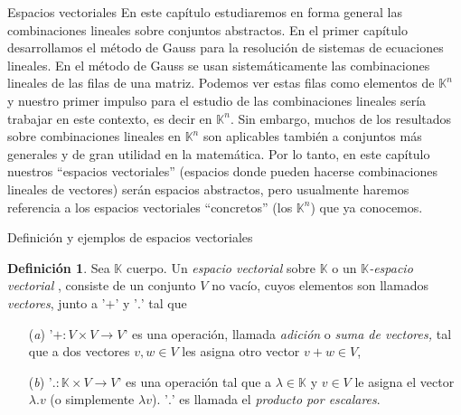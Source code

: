 \documentclass[a4paper,12pt,twoside,spanish,reqno]{amsbook}
\numberwithin{equation}{section}
\theoremstyle{definition}
\newtheorem{definicion}[teorema]{Definici\'on}
\theoremstyle{remark}
\newcommand{\K}{\mathbb K}
\begin{document}
    \begin{chapter}{Espacios vectoriales}\label{chap-esp-vect} En este capítulo estudiaremos en forma general las combinaciones lineales sobre conjuntos abstractos.
        En el primer capítulo desarrollamos el método de Gauss para la resolución de sistemas de ecuaciones lineales. En el método de Gauss se usan sistemáticamente las combinaciones lineales de las filas de una matriz. Podemos ver estas filas como elementos de $\K^n$  y nuestro primer impulso para el estudio de las combinaciones lineales sería trabajar en este contexto, es decir  en $\K^n$.  Sin embargo, muchos de los resultados sobre combinaciones lineales en $\K^n$ son aplicables también a conjuntos más generales y de gran utilidad en la matemática. Por lo tanto, en este capítulo nuestros ``espacios vectoriales'' (espacios donde pueden hacerse combinaciones lineales de vectores) serán espacios abstractos, pero usualmente haremos referencia a los espacios vectoriales ``concretos'' (los $\K^n$) que ya conocemos. 
        

        

        
        \begin{section}{Definición y ejemplos de espacios vectoriales}\label{seccion-definicion-de-espacios-vectoriales}
            
            \begin{definicion}\label{def-esp-vect} Sea $\K$ cuerpo. Un \textit{espacio vectorial} sobre $\K$ o un \textit{$\K$-espacio vectorial }, consiste de  un  conjunto $V$ no vacío, cuyos elementos son llamados \textit{vectores}, junto a  '$+$' y '$.$' tal que
                \begin{enumerate}
                    \item[(\textit{a})] '$+\colon V\times V\to V$' es una operación, llamada \textit{adición} o  \textit{suma de vectores,} tal que a dos vectores $v,w \in V$ les asigna otro vector $v+w \in V$,
                    \item[(\textit{b})]  '$.
                     \colon \K\times V\to V$' es una operación tal que a $\lambda \in \K$ y $v \in V$ le asigna el vector $\lambda.v$ (o simplemente $\lambda v$).  '$.$' es llamada  el \textit{producto por escalares}.
                     

\end{enumerate}
\end{definicion}
\end{section}
\end{chapter}
\end{document}
